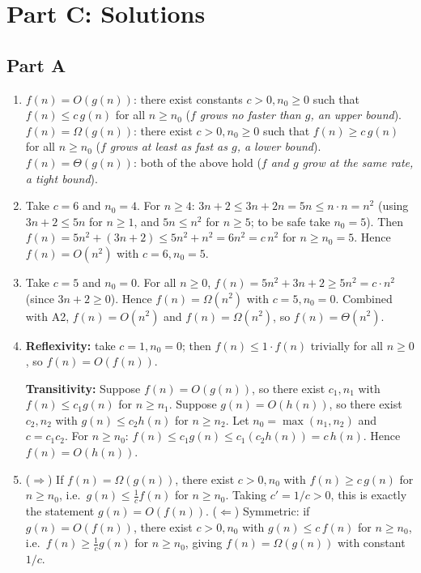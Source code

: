 \documentclass[11pt]{article}
\begin{document}
\newpage
\section*{Part C: Solutions}

\subsection*{Part A}

\begin{enumerate}[label=\textbf{A\arabic*.}, leftmargin=2.2em]

\item $f(n) = O(g(n))$: there exist constants $c > 0, n_0 \ge 0$ such that $f(n) \le
c\,g(n)$ for all $n \ge n_0$ (\emph{$f$ grows no faster than $g$, an upper bound}).
$f(n) = \Omega(g(n))$: there exist $c > 0, n_0 \ge 0$ such that $f(n) \ge c\,g(n)$ for all
$n \ge n_0$ (\emph{$f$ grows at least as fast as $g$, a lower bound}). $f(n) =
\Theta(g(n))$: both of the above hold (\emph{$f$ and $g$ grow at the same rate, a tight
bound}).

\item Take $c = 6$ and $n_0 = 4$. For $n \ge 4$: $3n + 2 \le 3n + 2n = 5n \le n \cdot n =
n^2$ (using $3n+2 \le 5n$ for $n \ge 1$, and $5n \le n^2$ for $n \ge 5$; to be safe take
$n_0=5$). Then $f(n) = 5n^2 + (3n+2) \le 5n^2 + n^2 = 6n^2 = c\,n^2$ for $n \ge n_0 = 5$.
Hence $f(n) = O(n^2)$ with $c=6, n_0=5$.

\item Take $c = 5$ and $n_0 = 0$. For all $n \ge 0$, $f(n) = 5n^2 + 3n + 2 \ge 5n^2 = c
\cdot n^2$ (since $3n+2 \ge 0$). Hence $f(n) = \Omega(n^2)$ with $c=5, n_0=0$. Combined with
A2, $f(n) = O(n^2)$ and $f(n) = \Omega(n^2)$, so $f(n) = \Theta(n^2)$.

\item \textbf{Reflexivity:} take $c=1, n_0=0$; then $f(n) \le 1 \cdot f(n)$ trivially for
all $n \ge 0$, so $f(n) = O(f(n))$.

\textbf{Transitivity:} Suppose $f(n) = O(g(n))$, so there exist $c_1, n_1$ with $f(n) \le
c_1 g(n)$ for $n \ge n_1$. Suppose $g(n) = O(h(n))$, so there exist $c_2, n_2$ with $g(n)
\le c_2 h(n)$ for $n \ge n_2$. Let $n_0 = \max(n_1,n_2)$ and $c = c_1 c_2$. For $n \ge n_0$:
$f(n) \le c_1 g(n) \le c_1 (c_2 h(n)) = c\,h(n)$. Hence $f(n) = O(h(n))$.

\item ($\Rightarrow$) If $f(n) = \Omega(g(n))$, there exist $c>0, n_0$ with $f(n) \ge
c\,g(n)$ for $n \ge n_0$, i.e.\ $g(n) \le \frac{1}{c} f(n)$ for $n \ge n_0$. Taking $c' =
1/c > 0$, this is exactly the statement $g(n) = O(f(n))$. ($\Leftarrow$) Symmetric: if
$g(n) = O(f(n))$, there exist $c>0, n_0$ with $g(n) \le c\,f(n)$ for $n \ge n_0$, i.e.\
$f(n) \ge \frac{1}{c} g(n)$ for $n \ge n_0$, giving $f(n) = \Omega(g(n))$ with constant
$1/c$.


\end{enumerate}
\end{document}
